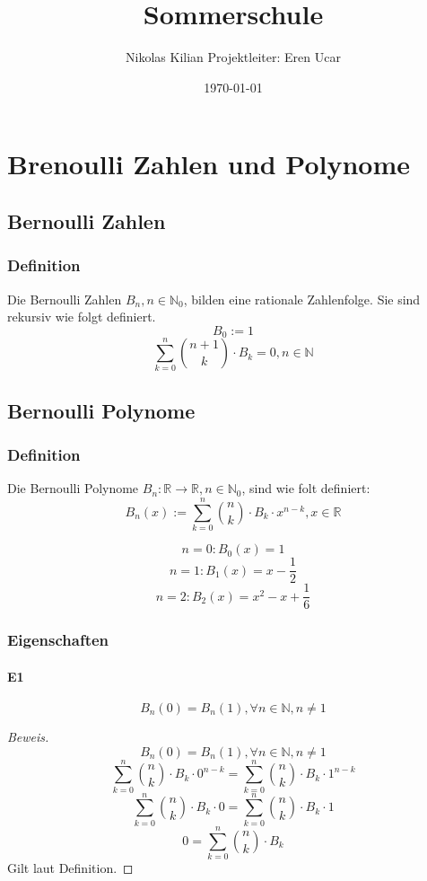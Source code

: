 \documentclass[12pt]{article}
\begin{document}
\title{\vspace{-2.0cm}Sommerschule}
\author{Nikolas Kilian
Projektleiter: Eren Ucar}
\date{\today}
\maketitle

\tableofcontents

\section{Brenoulli Zahlen und Polynome}
\subsection{Bernoulli Zahlen}
\subsubsection{Definition}

Die Bernoulli Zahlen \(B_n, n \in \mathbb{N}_0\), bilden eine rationale Zahlenfolge.
Sie sind rekursiv wie folgt definiert.
\[B_0 := 1\]
\[\sum_{k=0}^n {n+1 \choose k} \cdot B_k = 0, n \in \mathbb{N}\]

\subsection{Bernoulli Polynome}
\subsubsection{Definition}

Die Bernoulli Polynome \(B_n:\mathbb{R}\to\mathbb{R},n\in\mathbb{N}_0\), sind wie folt definiert:
\[B_n(x) := \sum_{k=0}^n {n \choose k} \cdot B_k \cdot x^{n-k}, x\in\mathbb{R}\]

\[n = 0: B_0(x) = 1\]
\[n = 1: B_1(x) = x - \frac{1}{2}\]
\[n = 2: B_2(x) = x^2 - x + \frac{1}{6}\]

\subsubsection{Eigenschaften}
\paragraph{E1} 
\[B_n(0) = B_n(1), \forall n\in\mathbb{N}, n \neq 1\]

\begin{proof}[Beweis]
\[B_n(0) = B_n(1), \forall n\in\mathbb{N}, n \neq 1\]
\[\sum_{k=0}^n {n \choose k} \cdot B_k \cdot 0^{n-k} = \sum_{k=0}^n {n \choose k} \cdot B_k \cdot 1^{n-k}\]
\[\sum_{k=0}^n {n \choose k} \cdot B_k \cdot 0 = \sum_{k=0}^n {n \choose k} \cdot B_k \cdot 1\]
\[0 = \sum_{k=0}^n {n \choose k} \cdot B_k\]
Gilt laut Definition.
\end{proof}
\end{document}

